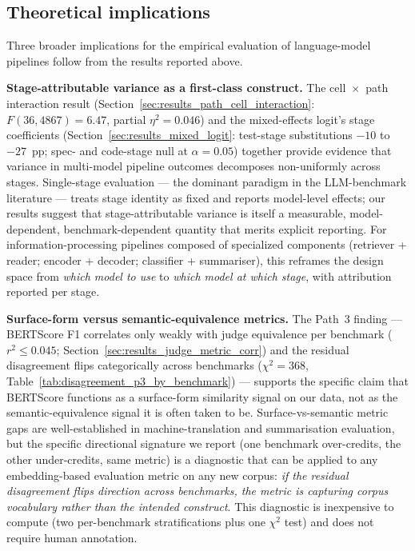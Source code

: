 \subsection{Theoretical implications}
\label{sec:discussion_theoretical}

Three broader implications for the empirical evaluation of language-model pipelines follow from the results reported above.

\textbf{Stage-attributable variance as a first-class construct.} The cell~$\times$~path interaction result (Section~\ref{sec:results_path_cell_interaction}: $F(36, 4867) = 6.47$, partial $\eta^2 = 0.046$) and the mixed-effects logit's stage coefficients (Section~\ref{sec:results_mixed_logit}: test-stage substitutions $-10$ to $-27$~pp; spec- and code-stage null at $\alpha = 0.05$) together provide evidence that variance in multi-model pipeline outcomes decomposes non-uniformly across stages. Single-stage evaluation --- the dominant paradigm in the LLM-benchmark literature --- treats stage identity as fixed and reports model-level effects; our results suggest that stage-attributable variance is itself a measurable, model-dependent, benchmark-dependent quantity that merits explicit reporting. For information-processing pipelines composed of specialized components (retriever + reader; encoder + decoder; classifier + summariser), this reframes the design space from \emph{which model to use} to \emph{which model at which stage}, with attribution reported per stage.

\textbf{Surface-form versus semantic-equivalence metrics.} The Path~3 finding --- BERTScore F1 correlates only weakly with judge equivalence per benchmark ($r^2 \leq 0.045$; Section~\ref{sec:results_judge_metric_corr}) and the residual disagreement flips categorically across benchmarks ($\chi^2 = 368$, Table~\ref{tab:disagreement_p3_by_benchmark}) --- supports the specific claim that BERTScore functions as a surface-form similarity signal on our data, not as the semantic-equivalence signal it is often taken to be. Surface-vs-semantic metric gaps are well-established in machine-translation and summarisation evaluation, but the specific directional signature we report (one benchmark over-credits, the other under-credits, same metric) is a diagnostic that can be applied to any embedding-based evaluation metric on any new corpus: \emph{if the residual disagreement flips direction across benchmarks, the metric is capturing corpus vocabulary rather than the intended construct}. This diagnostic is inexpensive to compute (two per-benchmark stratifications plus one $\chi^2$ test) and does not require human annotation.

